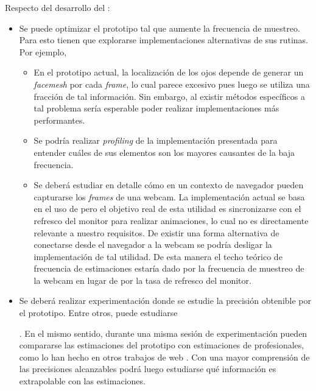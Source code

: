Respecto del desarrollo del \eyetracker: 
\begin{itemize}
  \item Se puede optimizar el prototipo tal que aumente la frecuencia de
muestreo.
  Para esto tienen que explorarse implementaciones alternativas de sus rutinas.
  Por ejemplo, 
  \begin{itemize}
    \item En el prototipo actual, la localización de los ojos depende de
generar un \textit{facemesh} por cada \textit{frame}, lo cual parece excesivo
pues luego se utiliza una fracción de tal información.
    Sin embargo, al existir métodos específicos a tal problema
\cite{hansen_2009_eye_of_the_beholder} sería esperable poder realizar
implementaciones más performantes. 

    \item Se podría realizar \textit{profiling} de la implementación presentada
para entender cuáles de sus elementos son los mayores causantes de la baja
frecuencia. 

    \item Se deberá estudiar en detalle cómo en un contexto de navegador pueden
capturarse los \textit{frames} de una webcam.
    La implementación actual se basa en el uso de \raf pero el
objetivo real de esta utilidad es sincronizarse con el refresco del monitor
para realizar animaciones, lo cual no es directamente relevante a nuestro
requisitos.
    De existir una forma alternativa de conectarse desde el navegador a la
webcam se podría desligar la implementación de tal utilidad.
    De esta manera el techo teórico de frecuencia de estimaciones estaría dado
por la frecuencia de muestreo de la webcam en lugar de por la tasa de refresco
del monitor.
  \end{itemize}

  \item Se deberá realizar experimentación donde se estudie la precisión
obtenible por el prototipo.
    Entre otros, puede estudiarse .
  En el mismo sentido, durante una misma sesión de experimentación pueden
compararse las estimaciones del prototipo con estimaciones de \eyetrackers 
profesionales, como lo han hecho en otros trabajos de \eyetracking web
\cite{xu_2015_turker_gaze, huang_2016_pace}.
  Con una mayor comprensión de las precisiones alcanzables podrá luego
estudiarse qué información es extrapolable con las estimaciones.


\end{itemize}
